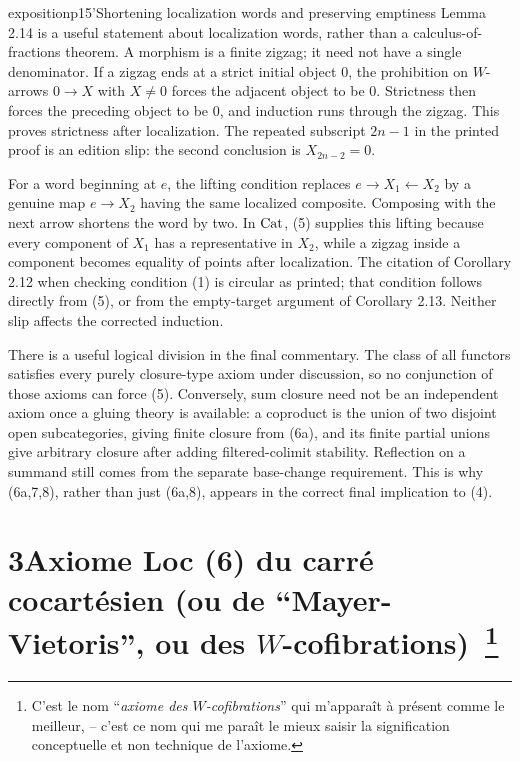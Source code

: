 
\begin{dcomment}{exposition}{p15'}{Shortening localization words and preserving emptiness}
Lemma 2.14 is a useful statement about localization words, rather than a calculus-of-fractions theorem. A morphism is a finite zigzag; it need not have a single denominator. If a zigzag ends at a strict initial object $0$, the prohibition on $W$-arrows $0\to X$ with $X\ne0$ forces the adjacent object to be $0$. Strictness then forces the preceding object to be $0$, and induction runs through the zigzag. This proves strictness after localization. The repeated subscript $2n-1$ in the printed proof is an edition slip: the second conclusion is $X_{2n-2}=0$.

For a word beginning at $e$, the lifting condition replaces $e\to X_1\leftarrow X_2$ by a genuine map $e\to X_2$ having the same localized composite. Composing with the next arrow shortens the word by two. In $\mathrm{Cat}$, (5) supplies this lifting because every component of $X_1$ has a representative in $X_2$, while a zigzag inside a component becomes equality of points after localization. The citation of Corollary 2.12 when checking condition (1) is circular as printed; that condition follows directly from (5), or from the empty-target argument of Corollary 2.13. Neither slip affects the corrected induction.

There is a useful logical division in the final commentary. The class of all functors satisfies every purely closure-type axiom under discussion, so no conjunction of those axioms can force (5). Conversely, sum closure need not be an independent axiom once a gluing theory is available: a coproduct is the union of two disjoint open subcategories, giving finite closure from (6a), and its finite partial unions give arbitrary closure after adding filtered-colimit stability. Reflection on a summand still comes from the separate base-change requirement. This is why (6a,7,8), rather than just (6a,8), appears in the correct final implication to (4).
\end{dcomment}


\section*{3\quad Axiome Loc (6) du carré cocartésien (ou de “Mayer-Vietoris”, ou des $W$-cofibrations)~\footnote[8]{C'est le nom “\textit{axiome des $W$-cofibrations}” qui m'apparaît à présent comme le meilleur, -- c'est ce nom qui me paraît le mieux saisir la signification conceptuelle et non technique de l'axiome.}}

